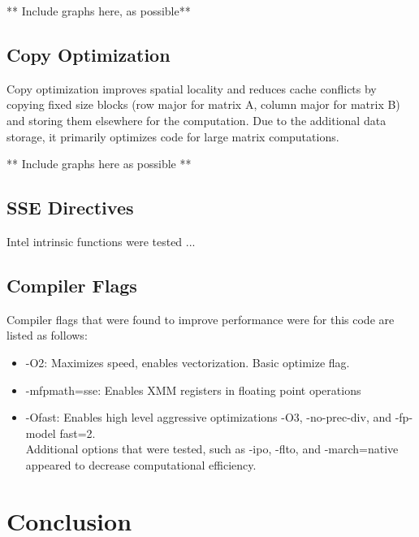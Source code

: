 \documentclass{article}	 %
\begin{document}
** Include graphs here, as possible**

\subsection{Copy Optimization}
Copy optimization improves spatial locality and reduces cache conflicts by copying fixed size blocks (row major for matrix A, column major for matrix B) and storing them elsewhere for the computation. Due to the additional data storage, it primarily optimizes code for large matrix computations. 

** Include graphs here as possible **

\subsection{SSE Directives}

Intel intrinsic functions were tested ...

\subsection{Compiler Flags}
Compiler flags that were found to improve performance were for this code are listed as follows: \\
\begin{itemize}
\item -O2: Maximizes speed, enables vectorization. Basic optimize flag. 
\item -mfpmath=sse: Enables XMM registers in floating point operations
\item -Ofast: Enables high level aggressive optimizations -O3, -no-prec-div, and -fp-model fast=2. 
\\ 

Additional options that were tested, such as -ipo, -flto, and -march=native appeared to decrease computational efficiency.
\end{itemize}

\section{Conclusion}

\end{document}
